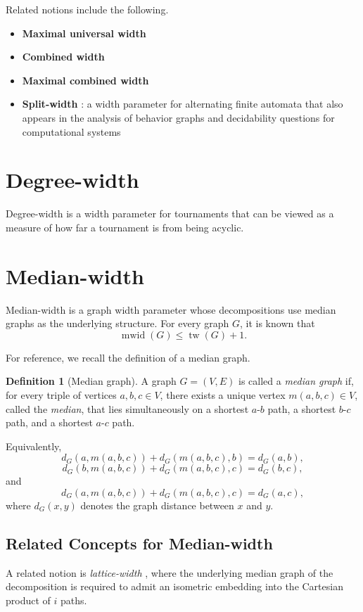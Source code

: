 \documentclass[10pt]{book}
\theoremstyle{definition}
\newtheorem{definition}[theorem]{Definition}
\begin{document}
Related notions include the following.

\begin{itemize}
    \item \textbf{Maximal universal width} \cite{192}
    \item \textbf{Combined width} \cite{204}
    \item \textbf{Maximal combined width} \cite{204}
    \item \textbf{Split-width} \cite{207,208}: a width parameter for alternating finite automata that also appears in the analysis of behavior graphs and decidability questions for computational systems \cite{cyriac2012mso,cyriac2014verification}
\end{itemize}

\section{Degree-width}
Degree-width \cite{351} is a width parameter for tournaments that can be viewed as a measure of how far a tournament is from being acyclic.

\section{Median-width}
Median-width \cite{354,355} is a graph width parameter whose decompositions use median graphs as the underlying structure.  
For every graph \(G\), it is known that
\[
\operatorname{mwid}(G)\leq \operatorname{tw}(G)+1.
\]
\cite{355}

For reference, we recall the definition of a median graph.

\begin{definition}[Median graph]
A graph \(G=(V,E)\) is called a \emph{median graph} if, for every triple of vertices \(a,b,c\in V\), there exists a unique vertex \(m(a,b,c)\in V\), called the \emph{median}, that lies simultaneously on a shortest \(a\)-\(b\) path, a shortest \(b\)-\(c\) path, and a shortest \(a\)-\(c\) path.

Equivalently,
\[
d_G(a,m(a,b,c))+d_G(m(a,b,c),b)=d_G(a,b),
\]
\[
d_G(b,m(a,b,c))+d_G(m(a,b,c),c)=d_G(b,c),
\]
and
\[
d_G(a,m(a,b,c))+d_G(m(a,b,c),c)=d_G(a,c),
\]
where \(d_G(x,y)\) denotes the graph distance between \(x\) and \(y\).
\end{definition}

\subsection{Related Concepts for Median-width}
A related notion is \emph{lattice-width} \cite{355}, where the underlying median graph of the decomposition is required to admit an isometric embedding into the Cartesian product of \(i\) paths.
\end{document}
